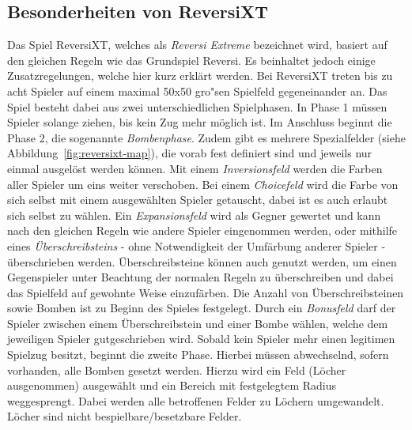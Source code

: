 \subsection{Besonderheiten von ReversiXT}\label{subsec:besonderheiten-von-reversixt}
Das Spiel ReversiXT, welches als \emph{Reversi Extreme} bezeichnet wird, basiert auf den gleichen Regeln wie das Grundspiel Reversi.
Es beinhaltet jedoch einige Zusatzregelungen, welche hier kurz erkl\"art werden.
Bei ReversiXT treten bis zu acht Spieler auf einem maximal 50x50 gro"sen Spielfeld gegeneinander an.
Das Spiel besteht dabei aus zwei unterschiedlichen Spielphasen.
In Phase 1 m\"ussen Spieler solange ziehen, bis kein Zug mehr m\"oglich ist.
Im Anschluss beginnt die Phase 2, die sogenannte \emph{Bombenphase}.
Zudem gibt es mehrere Spezialfelder (siehe Abbildung~\ref{fig:reversixt-map}), die vorab fest definiert sind und jeweils nur einmal ausgel\"ost werden k\"onnen.
Mit einem \emph{Inversionsfeld} werden die Farben aller Spieler um eins weiter verschoben.
Bei einem \emph{Choicefeld} wird die Farbe von sich selbst mit einem ausgew\"ahlten Spieler getauscht, dabei ist es auch erlaubt sich selbst zu w\"ahlen.
Ein \emph{Expansionsfeld} wird als Gegner gewertet und kann nach den gleichen Regeln wie andere Spieler eingenommen werden, oder mithilfe eines \emph{\"Uberschreibsteins} - ohne Notwendigkeit der Umf\"arbung anderer Spieler - \"uberschrieben werden.
\"Uberschreibsteine k\"onnen auch genutzt werden, um einen Gegenspieler unter Beachtung der normalen Regeln zu \"uberschreiben und dabei das Spielfeld auf gewohnte Weise einzuf\"arben.
Die Anzahl von \"Uberschreibsteinen sowie Bomben ist zu Beginn des Spieles festgelegt.
Durch ein \emph{Bonusfeld} darf der Spieler zwischen einem \"Uberschreibstein und einer Bombe w\"ahlen, welche dem jeweiligen Spieler gutgeschrieben wird.
Sobald kein Spieler mehr einen legitimen Spielzug besitzt, beginnt die zweite Phase.
Hierbei m\"ussen abwechselnd, sofern vorhanden, alle Bomben gesetzt werden.
Hierzu wird ein Feld (L\"ocher ausgenommen) ausgew\"ahlt und ein Bereich mit festgelegtem Radius weggesprengt.
Dabei werden alle betroffenen Felder zu L\"ochern umgewandelt.
L\"ocher sind nicht bespielbare/besetzbare Felder.

